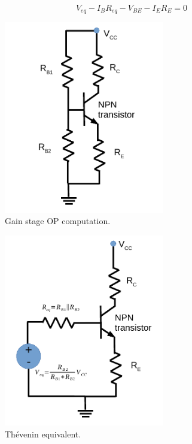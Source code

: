\begin{equation}
  V_{eq}-I_{B}R_{eq}-V_{BE}-I_{E}R_{E}=0
\end{equation}

\begin{multicols}{2}

  \begin{figure}[H]
  \begin{center}
   \includegraphics[width=7cm]{lab4_DC1.pdf}
  \caption{Gain stage OP computation.}
  \label{fig:DC analysis}
  \end{center}
  \end{figure}
  
  
  \begin{figure}[H]
  \begin{center}
   \includegraphics[width=7cm]{lab4_DC1_TH.pdf}
  \caption{Thévenin equivalent.}
  \label{fig:Thevenin}
  \end{center}
  \end{figure}
\end{multicols}

